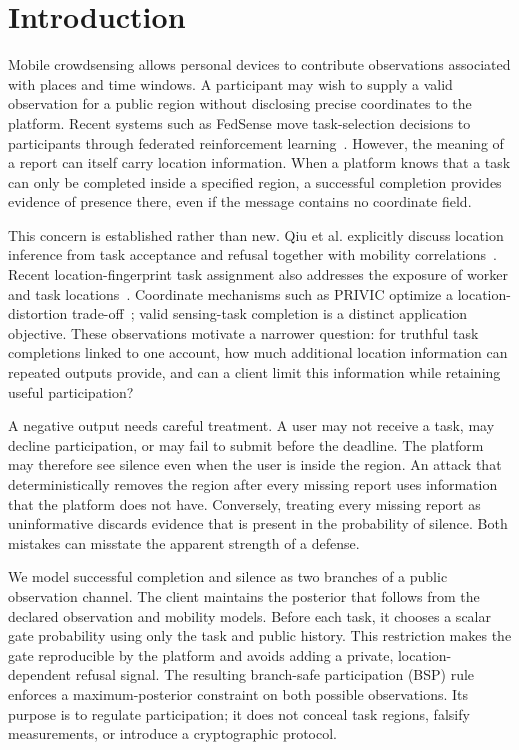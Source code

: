 \documentclass[review,12pt]{elsarticle}
\begin{document}
\section{Introduction}
Mobile crowdsensing allows personal devices to contribute observations associated with places and time windows. A participant may wish to supply a valid observation for a public region without disclosing precise coordinates to the platform. Recent systems such as FedSense move task-selection decisions to participants through federated reinforcement learning~\cite{fedsense2025}. However, the meaning of a report can itself carry location information. When a platform knows that a task can only be completed inside a specified region, a successful completion provides evidence of presence there, even if the message contains no coordinate field.

This concern is established rather than new. Qiu et al. explicitly discuss location inference from task acceptance and refusal together with mobility correlations~\cite{tmarkov}. Recent location-fingerprint task assignment also addresses the exposure of worker and task locations~\cite{fingerprint}. Coordinate mechanisms such as PRIVIC optimize a location-distortion trade-off~\cite{privic2024}; valid sensing-task completion is a distinct application objective. These observations motivate a narrower question: for truthful task completions linked to one account, how much additional location information can repeated outputs provide, and can a client limit this information while retaining useful participation?

A negative output needs careful treatment. A user may not receive a task, may decline participation, or may fail to submit before the deadline. The platform may therefore see silence even when the user is inside the region. An attack that deterministically removes the region after every missing report uses information that the platform does not have. Conversely, treating every missing report as uninformative discards evidence that is present in the probability of silence. Both mistakes can misstate the apparent strength of a defense.

We model successful completion and silence as two branches of a public observation channel. The client maintains the posterior that follows from the declared observation and mobility models. Before each task, it chooses a scalar gate probability using only the task and public history. This restriction makes the gate reproducible by the platform and avoids adding a private, location-dependent refusal signal. The resulting branch-safe participation (BSP) rule enforces a maximum-posterior constraint on both possible observations. Its purpose is to regulate participation; it does not conceal task regions, falsify measurements, or introduce a cryptographic protocol.
\end{document}
